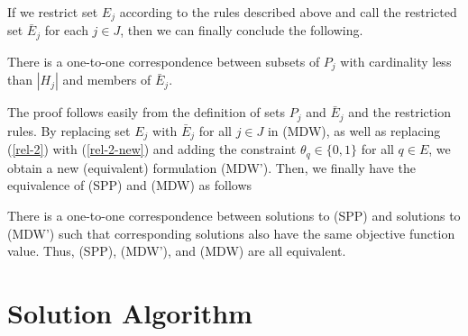 If we restrict set $E_j$ according to the rules described above and call the
restricted set $\bar{E}_j$ for each $j \in J$, then we can finally
conclude the following.
\begin{prop}
\label{dw-prop-p1}
There is a one-to-one correspondence between subsets of $P_j$ with
cardinality less than $|H_j|$ and members of $\bar{E}_j$.
\end{prop}
The proof follows easily from the definition of sets $P_j$ and $\bar{E}_j$
and the restriction rules. By replacing set $E_j$ with $\bar{E}_j$
for all $j \in J$ in (MDW), as well as replacing (\ref{rel-2}) with
(\ref{rel-2-new}) and adding the constraint $\theta_q \in \{0, 1\}$ for
all $q \in E$, we obtain a new (equivalent) formulation (MDW'). Then,
we finally have the equivalence of (SPP) and (MDW) as follows
\begin{prop}
\label{dw-prop-p2}
There is a one-to-one correspondence between solutions to (SPP)
and solutions to (MDW') such that corresponding solutions also have the
same objective function value. Thus, (SPP), (MDW'), and (MDW) are all
equivalent.
\end{prop}

\section{Solution Algorithm}
\label{sec:SolAlg}
